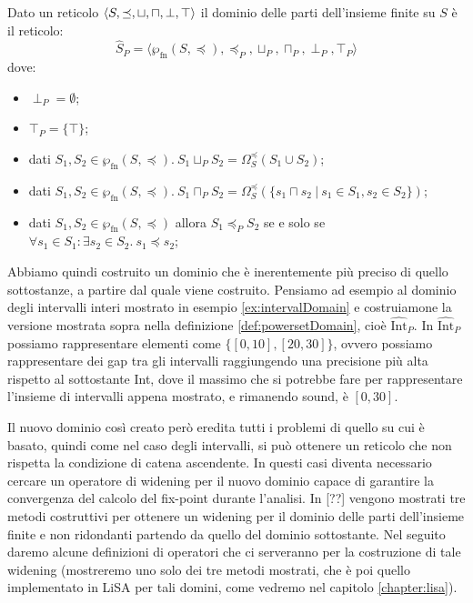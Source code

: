 \begin{definition}\label{def:powersetDomain}
Dato un reticolo \(\langle S, \preceq,\sqcup, \sqcap, \perp, \top\rangle\) il dominio delle parti dell'insieme finite su \(S\) è il reticolo:
\[\hat{S}_P = \langle \wp_{\textrm{fn}}(S, \preceq),\preceq_P, \sqcup_P, \sqcap_P, \perp_P, \top_P \rangle\]
dove:
\begin{itemize}
	\item \(\perp_P=\emptyset\);
	\item \(\top_P=\{\top\}\);
	\item dati \(S_1, S_2\in\wp_{\textrm{fn}}(S, \preceq).\ S_1 \sqcup_P S_2 = \Omega_{S}^{\preceq}(S_1 \cup S_2)\);
	\item dati \(S_1, S_2\in\wp_{\textrm{fn}}(S, \preceq).\ S_1 \sqcap_P S_2 = \Omega_{S}^{\preceq}(\{s_1 \sqcap s_2\ |\ s_1\in S_1, s_2\in S_2\})\);
	\item dati \(S_1, S_2\in\wp_{\textrm{fn}}(S, \preceq)\) allora \(S_1 \preceq_P S_2\) se e solo se \(\forall s_1 \in S_1 : \exists s_2 \in S_2.\ s_1\preceq s_2\);
\end{itemize}
\end{definition}

Abbiamo quindi costruito un dominio che è inerentemente più preciso di quello sottostanze, a partire dal quale viene costruito. Pensiamo ad esempio al dominio degli intervalli interi mostrato in esempio \ref{ex:intervalDomain} e costruiamone la versione mostrata sopra nella definizione \ref{def:powersetDomain}, cioè \(\hat{\textrm{Int}}_P\). In \(\hat{\textrm{Int}}_P\) possiamo rappresentare elementi come \(\{[0, 10], [20, 30]\}\), ovvero possiamo rappresentare dei gap tra gli intervalli raggiungendo una precisione più alta rispetto al sottostante Int, dove il massimo che si potrebbe fare per rappresentare l'insieme di intervalli appena mostrato, e rimanendo sound, è \([0, 30]\).

Il nuovo dominio così creato però eredita tutti i problemi di quello su cui è basato, quindi come nel caso degli intervalli, si può ottenere un reticolo che non rispetta la condizione di catena ascendente. In questi casi diventa necessario cercare un operatore di widening per il nuovo dominio capace di garantire la convergenza del calcolo del fix-point durante l'analisi. In [??] vengono mostrati tre metodi costruttivi per ottenere un widening per il dominio delle parti dell'insieme finite e non ridondanti partendo da quello del dominio sottostante. Nel seguito daremo alcune definizioni di operatori che ci serveranno per la costruzione di tale widening (mostreremo uno solo dei tre metodi mostrati, che è poi quello implementato in LiSA per tali domini, come vedremo nel capitolo \ref{chapter:lisa}).

